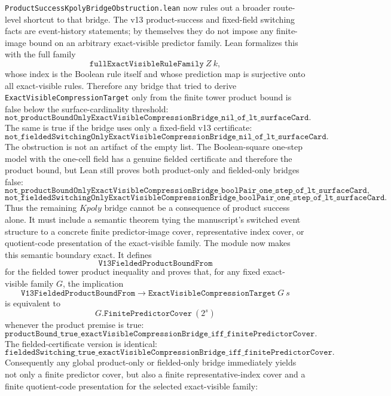 \documentclass[11pt]{article}
\theoremstyle{remark}
\begin{document}
\texttt{ProductSuccessKpolyBridgeObstruction.lean} now rules out a broader
route-level shortcut to that bridge.  The v13 product-success and fixed-field
switching facts are event-history statements; by themselves they do not impose
any finite-image bound on an arbitrary exact-visible predictor family.  Lean
formalizes this with the full family
\[
  \texttt{fullExactVisibleRuleFamily}\ Z\ k,
\]
whose index is the Boolean rule itself and whose prediction map is surjective
onto all exact-visible rules.  Therefore any bridge that tried to derive
\texttt{ExactVisibleCompressionTarget} only from the finite tower product bound
is false below the surface-cardinality threshold:
\[
  \texttt{not\_productBoundOnlyExactVisibleCompressionBridge\_nil\_of\_lt\_surfaceCard}.
\]
The same is true if the bridge uses only a fixed-field v13 certificate:
\[
  \texttt{not\_fieldedSwitchingOnlyExactVisibleCompressionBridge\_nil\_of\_lt\_surfaceCard}.
\]
The obstruction is not an artifact of the empty list.  The Boolean-square
one-step model with the one-cell field has a genuine fielded certificate and
therefore the product bound, but Lean still proves both product-only and
fielded-only bridges false:
\[
  \texttt{not\_productBoundOnlyExactVisibleCompressionBridge\_boolPair\_one\_step\_of\_lt\_surfaceCard},
\]
\[
  \texttt{not\_fieldedSwitchingOnlyExactVisibleCompressionBridge\_boolPair\_one\_step\_of\_lt\_surfaceCard}.
\]
Thus the remaining \(Kpoly\) bridge cannot be a consequence of product success
alone.  It must include a semantic theorem tying the manuscript's switched
event structure to a concrete finite predictor-image cover, representative
index cover, or quotient-code presentation of the exact-visible family.
The module now makes this semantic boundary exact.  It defines
\[
  \texttt{V13FieldedProductBoundFrom}
\]
for the fielded tower product inequality and proves that, for any fixed
exact-visible family \(G\), the implication
\[
  \texttt{V13FieldedProductBoundFrom}\to
  \texttt{ExactVisibleCompressionTarget}\ G\ s
\]
is equivalent to
\[
  G.\texttt{FinitePredictorCover}\ (2^s)
\]
whenever the product premise is true:
\[
  \texttt{productBound\_true\_exactVisibleCompressionBridge\_iff\_finitePredictorCover}.
\]
The fielded-certificate version is identical:
\[
  \texttt{fieldedSwitching\_true\_exactVisibleCompressionBridge\_iff\_finitePredictorCover}.
\]
Consequently any global product-only or fielded-only bridge immediately yields
not only a finite predictor cover, but also a finite representative-index cover
and a finite quotient-code presentation for the selected exact-visible family:
\end{document}

